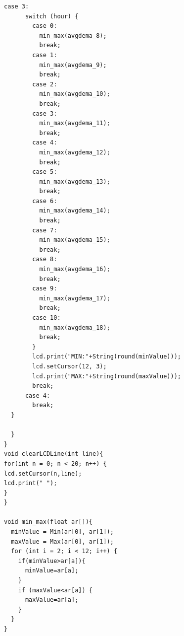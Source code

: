\documentclass[a4paper,9pt]{article}
\begin{document}
\begin{lstlisting}[basicstyle=\tiny,style=CStyle]
      case 3:
      switch (hour) {
        case 0: 
          min_max(avgdema_8);
          break;
        case 1:  
          min_max(avgdema_9);
          break;
        case 2: 
          min_max(avgdema_10);
          break;
        case 3: 
          min_max(avgdema_11);
          break;
        case 4: 
          min_max(avgdema_12);
          break;
        case 5: 
          min_max(avgdema_13);
          break;
        case 6: 
          min_max(avgdema_14);
          break;
        case 7: 
          min_max(avgdema_15);
          break;
        case 8: 
          min_max(avgdema_16);
          break;
        case 9: 
          min_max(avgdema_17);
          break;
        case 10:
          min_max(avgdema_18);
          break;
        }
        lcd.print("MIN:"+String(round(minValue)));
        lcd.setCursor(12, 3);
        lcd.print("MAX:"+String(round(maxValue)));
        break;
      case 4:
        break;
  }

  }
}
void clearLCDLine(int line){
for(int n = 0; n < 20; n++) { 
lcd.setCursor(n,line);
lcd.print(" ");
}
}

void min_max(float ar[]){
  minValue = Min(ar[0], ar[1]);
  maxValue = Max(ar[0], ar[1]); 
  for (int i = 2; i < 12; i++) {
    if(minValue>ar[a]){
      minValue=ar[a];
    }
    if (maxValue<ar[a]) {
      maxValue=ar[a];
    }
  }
}


 

\end{lstlisting}

\newpage
\end{document}

